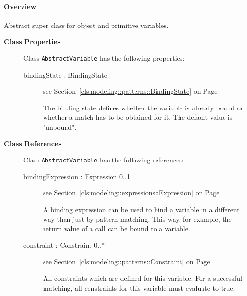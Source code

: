 \paragraph{Overview}

	
			
Abstract super class for object and primitive variables.	
		
	


\begin{description}

	\item[\textbf{Class Properties}] Class \texttt{AbstractVariable} has the following properties:
	\begin{description}
\item[bindingState : BindingState 	]
see Section~\ref{cls:modeling::patterns::BindingState} on Page~\pageref{cls:modeling::patterns::BindingState}
\hspace{\fill}
\nopagebreak


	
			
The binding state defines whether the variable is already bound or whether a match has to be obtained for it. The default value is "unbound".	
		
	
	\end{description}
	
	\item[\textbf{Class References}] Class \texttt{AbstractVariable} has the following references:
	\begin{description}
\item[bindingExpression : Expression 			0..1]
see Section~\ref{cls:modeling::expressions::Expression} on Page~\pageref{cls:modeling::expressions::Expression}
\hspace{\fill}
\nopagebreak


	
			
A binding expression can be used to bind a variable in a different way than just by pattern matching. This way, for example, the return value of a call can be bound to a variable.	
		
	
\item[constraint : Constraint 			0..$*$]
see Section~\ref{cls:modeling::patterns::Constraint} on Page~\pageref{cls:modeling::patterns::Constraint}
\hspace{\fill}
\nopagebreak


	
			
All constraints which are defined for this variable. For a successful matching, all constraints for this variable must evaluate to true.	
		

\end{description}
\end{description}
